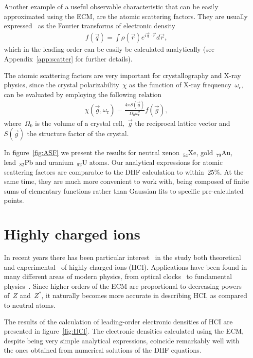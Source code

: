 Another example of a useful observable characteristic that can be easily approximated using the ECM, are the atomic scattering factors. They
are usually expressed~\cite{hau2012high} as the Fourier transforms of electronic density
\begin{align}
  f(\vec{q}) = \int \rho(\vec{r})e^{i \vec{q} \cdot \vec{r}}
  d\vec{r}, \label{eq:15}
\end{align}
which in the leading-order can be easily be calculated analytically (see
Appendix~\ref{app:scatter} for further details).

The atomic scattering factors are very important for crystallography
and X-ray physics, since the crystal polarizability~$\chi$ as the
function of X-ray frequency~$\omega_{\mathrm{r}}$, can be evaluated by
employing the following relation~\cite{ahmadi_feranchuk_2013}
\begin{align}
  \chi(\vec g, \omega_{\mathrm{r}}) = \frac{4 \pi S(\vec g)}{\Omega_{0}
  \omega_{\mathrm{r}}^{2}}
 f(\vec g), \label{eq:17}
\end{align}
where~$\Omega_0$ is the volume of a crystal cell,~$\vec g$ the
reciprocal lattice vector and~$S(\vec g)$ the structure factor of the
crystal.

In figure~\ref{fig:ASF} we present the results for neutral
xenon~$_{54}$Xe, gold~$_{79}$Au, lead~$_{82}$Pb and uranium~$_{92}$U
atoms. Our analytical expressions for atomic scattering factors are
comparable to the DHF calculation to within~$25\%$. At the same time, they are much more convenient to work with, being composed of finite sums of elementary functions rather than Gaussian fits to specific pre-calculated points.

\section{Highly charged ions}
\label{sec:highly-charged-ions}

In recent years there has been particular interest~\cite{IonsInterest} in the study both theoretical~\cite{IonsTheory} and experimental~\cite{IonsExperiment} of highly charged ions (HCI). Applications have been found in many different areas of modern physics, from optical clocks~\cite{IonsClocks} to fundamental physics~\cite{IOnsFundamental}. Since higher orders of the ECM are proportional to decreasing powers of~$Z$ and~$Z^*$, it naturally becomes more accurate in describing HCI, as compared to neutral atoms.

The results of the calculation of leading-order electronic densities of HCI are presented
in figure~\ref{fig:HCI}. The electronic densities calculated using the ECM, despite being
very simple analytical expressions,
coincide remarkably well with the ones obtained from numerical
solutions of the DHF equations.

